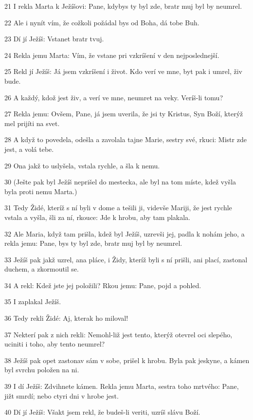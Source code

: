 \par 21 I rekla Marta k Ježíšovi: Pane, kdybys ty byl zde, bratr muj byl by neumrel.
\par 22 Ale i nynít vím, že cožkoli požádal bys od Boha, dá tobe Buh.
\par 23 Dí jí Ježíš: Vstanet bratr tvuj.
\par 24 Rekla jemu Marta: Vím, že vstane pri vzkríšení v den nejposlednejší.
\par 25 Rekl jí Ježíš: Já jsem vzkríšení i život. Kdo verí ve mne, byt pak i umrel, živ bude.
\par 26 A každý, kdož jest živ, a verí ve mne, neumret na veky. Veríš-li tomu?
\par 27 Rekla jemu: Ovšem, Pane, já jsem uverila, že jsi ty Kristus, Syn Boží, kterýž mel prijíti na svet.
\par 28 A když to povedela, odešla a zavolala tajne Marie, sestry své, rkuci: Mistr zde jest, a volá tebe.
\par 29 Ona jakž to uslyšela, vstala rychle, a šla k nemu.
\par 30 (Ješte pak byl Ježíš neprišel do mestecka, ale byl na tom míste, kdež vyšla byla proti nemu Marta.)
\par 31 Tedy Židé, kteríž s ní byli v dome a tešili ji, videvše Mariji, že jest rychle vstala a vyšla, šli za ní, rkouce: Jde k hrobu, aby tam plakala.
\par 32 Ale Maria, když tam prišla, kdež byl Ježíš, uzrevši jej, padla k nohám jeho, a rekla jemu: Pane, bys ty byl zde, bratr muj byl by neumrel.
\par 33 Ježíš pak jakž uzrel, ana pláce, i Židy, kteríž byli s ní prišli, ani plací, zastonal duchem, a zkormoutil se.
\par 34 A rekl: Kdež jste jej položili? Rkou jemu: Pane, pojd a pohled.
\par 35 I zaplakal Ježíš.
\par 36 Tedy rekli Židé: Aj, kterak ho miloval!
\par 37 Nekterí pak z nich rekli: Nemohl-liž jest tento, kterýž otevrel oci slepého, uciniti i toho, aby tento neumrel?
\par 38 Ježíš pak opet zastonav sám v sobe, prišel k hrobu. Byla pak jeskyne, a kámen byl svrchu položen na ni.
\par 39 I dí Ježíš: Zdvihnete kámen. Rekla jemu Marta, sestra toho mrtvého: Pane, jižt smrdí; nebo ctyri dni v hrobe jest.
\par 40 Dí jí Ježíš: Všakt jsem rekl, že budeš-li veriti, uzríš slávu Boží.
